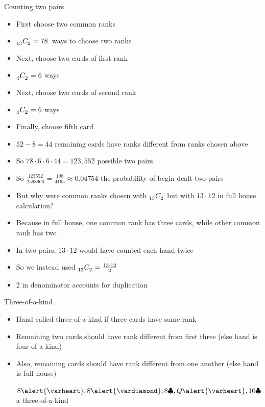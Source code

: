 \documentclass[handout]{beamer}
\theoremstyle{definition}
\newcommand\ncr[2]{\tensor[_{#1}]C{_{#2}}}
\newcommand{\hs}{\alert{\varheart}}
\newcommand{\ds}{\alert{\vardiamond}}
\newcommand{\cs}{\clubsuit}
\begin{document}
\begin{frame}{Counting two pairs}
\begin{itemize}
\item First choose two common ranks
\item $\ncr{13}{2}=78$~ways to choose two ranks
\item Next, choose two cards of first rank
\item $\ncr{4}{2}=6$ ways
\item Next, choose two cards of second rank
\item $\ncr{4}{2}=6$ ways
\item Finally, choose fifth card
\item $52-8=44$ remaining cards have ranks different
from ranks chosen above
\item So $78\cdot 6\cdot 6\cdot 44=123,552$ possible two pairs
\item So $\frac{123552}{2598960}=\frac{198}{4165}\approx 0.04754$
the probability of begin dealt two pairs
\end{itemize}
\end{frame}

\begin{frame}
\begin{itemize}
\item But why were common ranks chosen with $\ncr{13}{2}$
but with $13\cdot 12$ in full house calculation?
\item Because in full house, one common rank has \alert{three}
cards, while other common rank has \alert{two}
\item In two pairs, $13\cdot 12$ would have counted
each hand \alert{twice}
\item So we instead used
$\ncr{13}{2}=\frac{13\cdot 12}{2}$
\item $2$ in denominator accounts for duplication
\end{itemize}
\end{frame}

\begin{frame}{Three-of-a-kind}
\begin{itemize}
\item Hand called \alert{three-of-a-kind} if
three cards have same rank
\item Remaining two cards should have rank different
from first three (else hand is four-of-a-kind)
\item Also, remaining cards should have rank
different from one another (else hand is full house)
\begin{example} $8\hs,8\ds,8\cs,Q\hs,10\cs$ a three-of-a-kind\end{example}
\end{itemize}
\end{frame}
\end{document}
